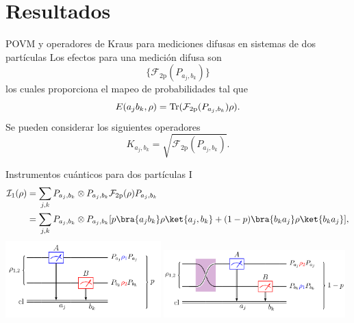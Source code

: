 \documentclass[svgnames,12pt,aspectratio=149]{beamer}
\newcommand{\tr}{{\rm Tr}}
\begin{document}
\section{Resultados}
\begin{frame}{POVM y operadores de Kraus para mediciones difusas en sistemas de dos partículas}
  Los efectos para una medición difusa son \[\{\mathcal{F}_{2\text{p}}(P_{a_j,b_k})\}\]los cuales proporciona el mapeo de probabilidades tal que \[   E(a_j b_k, \rho)= \tr(\mathcal{F}_{2\text{p}}({P_{a_j,b_k}})\rho).\] %
  Se pueden considerar los siguientes operadores \[K_{a_j,b_k}=\sqrt{\mathcal{F}_{2\text{p}}(P_{a_j,b_k})}.\]
\end{frame}



\begin{frame}{Instrumentos cuánticos para dos partículas I}
  \begin{equation*}\label{eq:fisrtinstrument2p}
    \begin{split}
        \mathcal{I}_1{(\rho)}&=\sum_{j,k}P_{a_j,b_k}\otimes P_{a_j,b_k} \mathcal{F}_{2\text{p}}(\rho) P_{a_j,b_k}\\
        &=\sum_{j,k}P_{a_j,b_k}\otimes P_{a_j,b_k} [p \bra{a_j b_k}\rho \ket{a_j,b_k}+(1-p)\bra{b_k a_j }\rho \ket {b_k a_j}],
\end{split}
\end{equation*}
\includegraphics[width=60mm]{images/fmideaqi.png}\hfill
\includegraphics[width=70mm]{images/fmqi1.png}
\end{frame}
\end{document}
